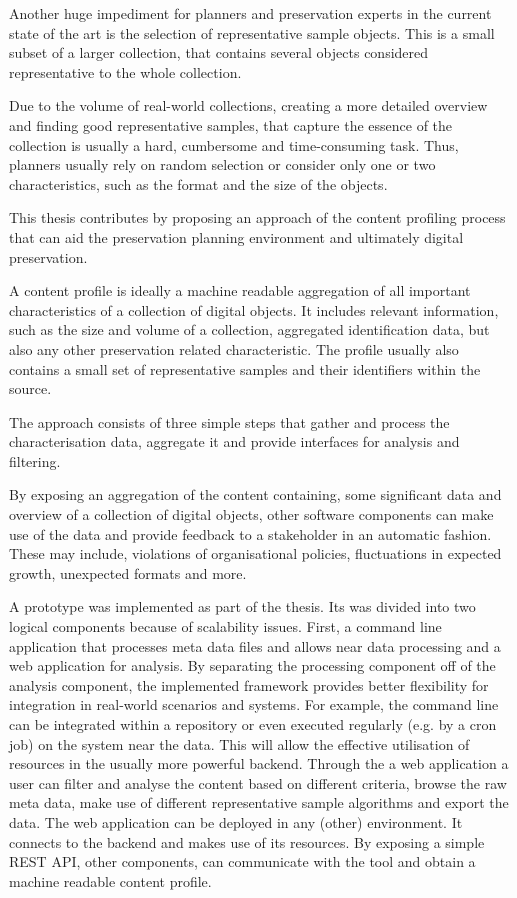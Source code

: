 Another huge impediment for planners and preservation experts in the current state of the art is the selection of representative sample objects. This is a small subset of a larger collection, that contains several objects considered representative to the whole collection. 

Due to the volume of real-world collections, creating a more detailed overview and finding good representative samples, that capture the essence of the collection is usually a hard, cumbersome and time-consuming task.
Thus, planners usually rely on random selection or consider only one or two characteristics, such as the format and the size of the objects.


This thesis contributes by proposing an approach of the content profiling process that can aid the preservation planning environment and ultimately digital preservation.

A content profile is ideally a machine readable aggregation of all important characteristics of a collection of digital objects. It includes relevant information, such as the size and volume of a collection, aggregated identification data, but also any other preservation related characteristic. The profile usually also contains a small set of representative samples and their identifiers within the source.

The approach consists of three simple steps that gather and process the characterisation data, aggregate it and provide
interfaces for analysis and filtering. 

By exposing an aggregation of the content containing, some significant data and overview of a collection of digital objects, other software components can make use of the data and provide feedback to a stakeholder in an automatic fashion. 
These may include, violations of organisational policies, fluctuations in expected growth, unexpected formats and more.

A prototype was implemented as part of the thesis. Its was divided into two logical components because of scalability issues.
First, a command line application that processes meta data files and allows near data processing and a web application for analysis. By separating the processing component off of the analysis component, the implemented framework provides
better flexibility for integration in real-world scenarios and systems. For example, the command line can be integrated within a repository or even executed regularly (e.g. by a cron job) on the system near the data. This will allow the effective utilisation of resources in the usually more powerful backend.
Through the a web application a user can filter and analyse the content based on different criteria, browse the raw meta data, make use of different representative sample algorithms and export the data. The web application can be deployed in any (other) environment. It connects to the backend and makes use of its resources. By exposing a simple REST API, other components, can communicate with the tool and obtain a machine readable content profile.
 
